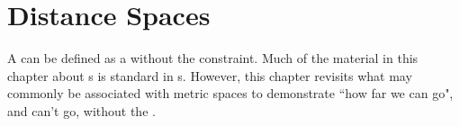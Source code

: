 ﻿%

\chapter{Distance Spaces}
\label{chp:dspace}

A   can be defined as a  
without the  constraint.
Much of the material in this chapter about s is
standard in s.
However, this chapter revisits what may commonly be associated with metric spaces 
to demonstrate ``how far we can go", and can't go, 
without the .

